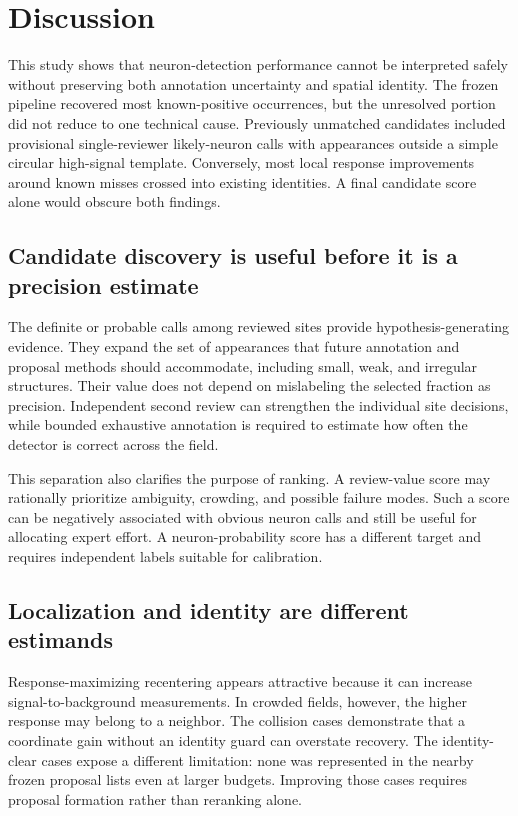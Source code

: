 \section{Discussion}

This study shows that neuron-detection performance cannot be interpreted safely
without preserving both annotation uncertainty and spatial identity. The frozen
pipeline recovered most known-positive occurrences, but the unresolved portion
did not reduce to one technical cause. Previously unmatched candidates included
provisional single-reviewer likely-neuron calls with appearances outside a
simple circular high-signal
template. Conversely, most local response improvements around known misses
crossed into existing identities. A final candidate score alone would obscure
both findings.

\subsection{Candidate discovery is useful before it is a precision estimate}

The \VenueReviewLikely{} definite or probable calls among
\VenueReviewedCandidates{} reviewed sites provide hypothesis-generating
evidence. They expand the set of appearances that future
annotation and proposal methods should accommodate, including small, weak, and
irregular structures. Their value does not depend on mislabeling the selected
fraction as precision. Independent second review can strengthen the individual
site decisions, while bounded exhaustive annotation is required to estimate how
often the detector is correct across the field.

This separation also clarifies the purpose of ranking. A review-value score may
rationally prioritize ambiguity, crowding, and possible failure modes. Such a
score can be negatively associated with obvious neuron calls and still be useful
for allocating expert effort. A neuron-probability score has a different target
and requires independent labels suitable for calibration.

\subsection{Localization and identity are different estimands}

Response-maximizing recentering appears attractive because it can increase
signal-to-background measurements. In crowded fields, however, the higher
response may belong to a neighbor. The \VenueIdentityCollision{} collision cases
demonstrate that a coordinate gain without an identity guard can overstate
recovery. The \VenueIdentityClear{} identity-clear cases expose a different
limitation: none was represented in the
nearby frozen proposal lists even at larger budgets. Improving those cases
requires proposal formation rather than reranking alone.

